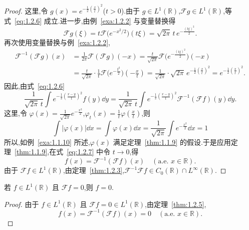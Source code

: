 \begin{proof}
这里,令 $g(x) = e^{-\frac{1}{2}\left(\frac{x}{t}\right)^{2}}$($t > 0$).由于 $g \in L^{1}(\mathbb{R})$,$\mathcal{F}g \in L^{1}(\mathbb{R})$,等式~\eqref{eq:1.2.6} 成立.进一步,由例~\ref{exa:1.2.2} 与变量替换得
\begin{equation*}
\mathcal{F}g(\xi) = t\mathcal{F}\bigl(e^{-x^{2}/2}\bigr)(t\xi) = \sqrt{2\pi}\,t\,e^{-\frac{(t\xi)^{2}}{2}}.
\end{equation*}
再次使用变量替换与例~\ref{exa:1.2.2},
\begin{align*}
\mathcal{F}^{-1}(\mathcal{F}g)(x) & = \frac{1}{2\pi}\mathcal{F}(\mathcal{F}g)(-x) = \frac{t}{\sqrt{2\pi}}\mathcal{F}\bigl(e^{-\frac{(t\xi)^{2}}{2}}\bigr)(-x) \\
& = \frac{t}{\sqrt{2\pi}}\cdot\frac{1}{t}\mathcal{F}\bigl(e^{-\frac{\xi^{2}}{2}}\bigr)\left(-\frac{x}{t}\right) = \frac{1}{\sqrt{2\pi}}\cdot\sqrt{2\pi}\,e^{-\frac{1}{2}\left(\frac{x}{t}\right)^{2}} = e^{-\frac{1}{2}\left(\frac{x}{t}\right)^{2}}.
\end{align*}
因此,由式~\eqref{eq:1.2.6}
\begin{equation}\tag{1.2.7}
\frac{1}{\sqrt{2\pi}\,t}\int e^{-\frac{1}{2}\left(\frac{x-y}{t}\right)^{2}}f(y)\dd y = \frac{1}{\sqrt{2\pi}\,t}\int e^{-\frac{1}{2}\left(\frac{x-y}{t}\right)^{2}}\mathcal{F}^{-1}(\mathcal{F}f)(y)\dd y.
\label{eq:1.2.7}\end{equation}
这里,令 $\varphi(x) = \frac{1}{\sqrt{2\pi}}e^{-\frac{x^{2}}{2}}$,$\varphi_{t}(x) = \frac{1}{t}\varphi\left(\frac{x}{t}\right)$,则
\begin{equation*}
\int|\varphi(x)|\dd x = \int\varphi(x)\dd x = \frac{1}{\sqrt{2\pi}}\int e^{-\frac{x^{2}}{2}}\dd x = 1
\end{equation*}
所以,如例~\ref{exa:1.1.10} 所述,$\varphi(x)$ 满足定理~\ref{thm:1.1.9} 的假设.于是应用定理~\ref{thm:1.1.9},在式~\eqref{eq:1.2.7} 中令 $t \to 0$,得
\begin{equation*}
f(x) = \mathcal{F}^{-1}(\mathcal{F}f)(x) \quad (\text{a.e. } x \in \mathbb{R}).
\end{equation*}
由于 $\mathcal{F}f \in L^{1}(\mathbb{R})$,由定理~\ref{thm:1.2.3},$\mathcal{F}^{-1}\mathcal{F}f \in C_{0}(\mathbb{R}) \cap L^{\infty}(\mathbb{R})$.
\end{proof}

\begin{lemma}\label{lem:1.2.6}
若 $f \in L^{1}(\mathbb{R})$ 且 $\mathcal{F}f = 0$,则 $f = 0$.
\end{lemma}

\begin{proof}
由于 $f \in L^{1}(\mathbb{R})$ 且 $\mathcal{F}f = 0 \in L^{1}(\mathbb{R})$,由定理~\ref{thm:1.2.5},
\begin{equation*}
f(x) = \mathcal{F}^{-1}(\mathcal{F}f)(x) = 0 \quad (\text{a.e. } x \in \mathbb{R}).
\end{equation*}
\end{proof}

